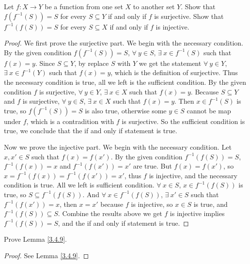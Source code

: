 \begin{exercise}\label{ex 3.4.5}
Let \(f : X \to Y\) be a function from one set \(X\) to another set \(Y\).
Show that \(f(f^{-1}(S)) = S\) for every \(S \subseteq Y\) if and only if \(f\) is surjective.
Show that \(f^{-1}(f(S)) = S\) for every \(S \subseteq X\) if and only if \(f\) is injective.
\end{exercise}

\begin{proof}
We first prove the surjective part.
We begin with the necessary condition.
By the given condition \(f(f^{-1}(S)) = S\), \(\forall\ y \in S\), \(\exists\ x \in f^{-1}(S)\) such that \(f(x) = y\).
Since \(S \subseteq Y\), by replace \(S\) with \(Y\) we get the statement \(\forall\ y \in Y\), \(\exists\ x \in f^{-1}(Y)\) such that \(f(x) = y\), which is the definition of surjective.
Thus the necessary condition is true, all we left is the sufficient condition.
By the given condition \(f\) is surjective, \(\forall\ y \in Y\), \(\exists\ x \in X\) such that \(f(x) = y\).
Because \(S \subseteq Y\) and \(f\) is surjective, \(\forall\ y \in S\), \(\exists\ x \in X\) such that \(f(x) = y\).
Then \(x \in f^{-1}(S)\) is true, so \(f(f^{-1}(S)) = S\) is also true, otherwise some \(y \in S\) cannot be map under \(f\), which is a contradition with \(f\) is surjective.
So the sufficient condition is true, we conclude that the if and only if statement is true.

Now we prove the injective part.
We begin with the necessary condition.
Let \(x, x' \in S\) such that \(f(x) = f(x')\).
By the given condition \(f^{-1}(f(S)) = S\), \(f^{-1}(f(x)) = x\) and \(f^{-1}(f(x')) = x'\) are true.
But \(f(x) = f(x')\), so \(x = f^{-1}(f(x)) = f^{-1}(f(x')) = x'\), thus \(f\) is injective, and the necessary condition is true.
All we left is sufficient condition.
\(\forall\ x \in S\), \(x \in f^{-1}(f(S))\) is true, so \(S \subseteq f^{-1}(f(S))\).
And \(\forall\ x \in f^{-1}(f(S))\), \(\exists\ x' \in S\) such that \(f^{-1}(f(x')) = x\), then \(x = x'\) because \(f\) is injective, so \(x \in S\) is true, and \(f^{-1}(f(S)) \subseteq S\).
Combine the results above we get \(f\) is injective implies \(f^{-1}(f(S)) = S\), and the if and only if statement is true.
\end{proof}

\begin{exercise}\label{ex 3.4.6}
Prove Lemma \ref{3.4.9}.
\end{exercise}

\begin{proof}
See Lemma \ref{3.4.9}.
\end{proof}

